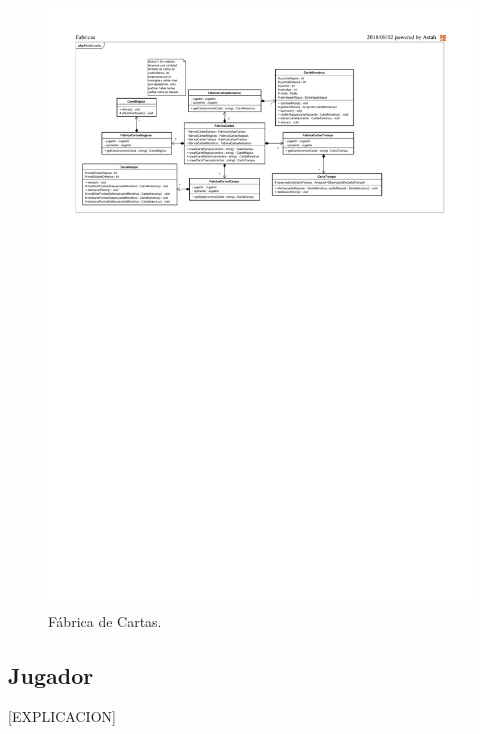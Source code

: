 \begin{figure}[H]
	\centering
	\includegraphics[scale=0.8]{includes/class_FabricaCartas}
	\caption{Fábrica de Cartas.}
	\label{class_FabricaCartas}
\end{figure}

\subsection{Jugador}

[EXPLICACION]

